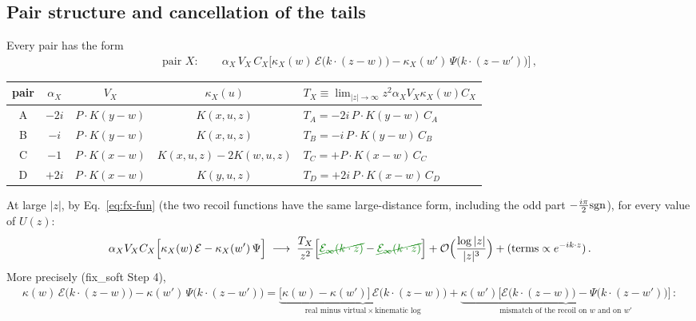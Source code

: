 \documentclass[9pt]{article}
\numberwithin{equation}{section}
\begin{document}
{\subsection*{Pair structure and cancellation of the tails}
Every pair has the form
\begin{align}
\text{pair }X:\qquad \alpha_{X}\,V_{X}\,C_{X}\Big[\kappa_{X}(w)\,\mathcal{E}\big(k\cdot(z-w)\big)-\kappa_{X}(w')\,\Psi\big(k\cdot(z-w')\big)\Big]\,,\label{eq:fx-pair}
\end{align}
\begin{center}
\renewcommand{\arraystretch}{1.3}
\begin{tabular}{|c|c|c|c|l|}\hline
pair & $\alpha_{X}$ & $V_{X}$ & $\kappa_{X}(u)$ & $T_{X}\equiv\lim_{|z|\to\infty} z^{2}\alpha_{X}V_{X}\kappa_{X}(w)C_{X}$\\\hline
A & $-2i$ & $P\cdot K(y-w)$ & $K(x,u,z)$ & $T_{A}=-2i\,P\!\cdot\!K(y-w)\,C_{A}$\\
B & $-i$ & $P\cdot K(y-w)$ & $K(x,u,z)$ & $T_{B}=-i\,P\!\cdot\!K(y-w)\,C_{B}$\\
C & $-1$ & $P\cdot K(x-w)$ & $K(x,u,z)-2K(w,u,z)$ & $T_{C}=+P\!\cdot\!K(x-w)\,C_{C}$\\
D & $+2i$ & $P\cdot K(x-w)$ & $K(y,u,z)$ & $T_{D}=+2i\,P\!\cdot\!K(x-w)\,C_{D}$\\\hline
\end{tabular}
\end{center}
At large $|z|$, by Eq.~\eqref{eq:fx-fun} (the two recoil functions have the same large-distance form, including the odd part $-\frac{i\pi}{2}{\rm sgn}$), for every value of $U(z)$:
\begin{align}
\alpha_{X}V_{X}C_{X}\Big[\kappa_{X}(w)\,\mathcal{E}-\kappa_{X}(w')\,\Psi\Big]\;\longrightarrow\;\frac{T_{X}}{z^{2}}\Big[{\color{green!50!black}\cancel{\mathcal{E}_{\infty}(k\cdot z)}}-{\color{green!50!black}\cancel{\mathcal{E}_{\infty}(k\cdot z)}}\Big]+{\cal O}\Big(\frac{\log|z|}{|z|^{3}}\Big)+(\text{terms}\propto e^{-ik\cdot z})\,.\notag
\end{align}
More precisely (fix\_soft Step 4),
\begin{align}
\kappa(w)\,\mathcal{E}\big(k\cdot(z-w)\big)-\kappa(w')\,\Psi\big(k\cdot(z-w')\big)=\underbrace{\big[\kappa(w)-\kappa(w')\big]\,\mathcal{E}\big(k\cdot(z-w)\big)}_{\text{real minus virtual}\,\times\,\text{kinematic log}}+\underbrace{\kappa(w')\Big[\mathcal{E}\big(k\cdot(z-w)\big)-\Psi\big(k\cdot(z-w')\big)\Big]}_{\text{mismatch of the recoil on $w$ and on $w'$}}\,:\label{eq:fx-rmv}
\end{align}
}
\end{document}
